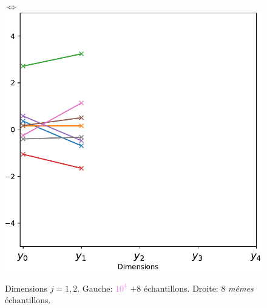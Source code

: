 \documentclass[xcolor=svgnames, t]{beamer}
\newcommand{\coloredemph}[1]{\textcolor{internationalblue}{\emph{#1}}}
\begin{document}
\begin{frame}{\subsecname}
\begin{figure}[ht]
    $\Longleftrightarrow$
    \includegraphics[scale=0.3]{gaussian_2d_valuevsindex.pdf}
    \caption{Dimensions $j=1, 2$. Gauche: \textcolor{violet}{$10^4$} $+8$ échantillons. 
    Droite: $8$ \coloredemph{mêmes} échantillons.}
  \end{figure}
\end{frame}
\end{document}
